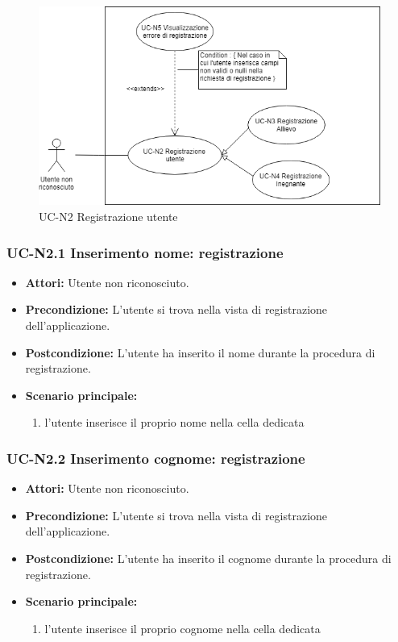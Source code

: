 \begin{figure}[h]
	\centering
	\includegraphics[scale=0.7]{images/UC-N2.png}
	\caption{UC-N2 Registrazione utente}
\end{figure}

\subsubsection{UC-N2.1 Inserimento nome: registrazione}
\begin{itemize}
	\item \textbf{Attori: }Utente non riconosciuto.
	\item \textbf{Precondizione: }L'utente si trova nella vista 		di registrazione dell'applicazione.
	\item \textbf{Postcondizione: }L'utente ha inserito il nome durante la procedura di registrazione.
	\item \textbf{Scenario principale: }
	\begin{enumerate}
		\item l'utente inserisce il proprio nome nella cella 				dedicata
	\end{enumerate}
\end{itemize}

\subsubsection{UC-N2.2 Inserimento cognome: registrazione}
\begin{itemize}
	\item \textbf{Attori: }Utente non riconosciuto.
	\item \textbf{Precondizione: }L'utente si trova nella vista 		di registrazione dell'applicazione.
	\item \textbf{Postcondizione: }L'utente ha inserito il cognome durante la procedura di registrazione.
	\item \textbf{Scenario principale: }
	\begin{enumerate}
		\item l'utente inserisce il proprio cognome nella cella 				dedicata
	\end{enumerate}
\end{itemize}

